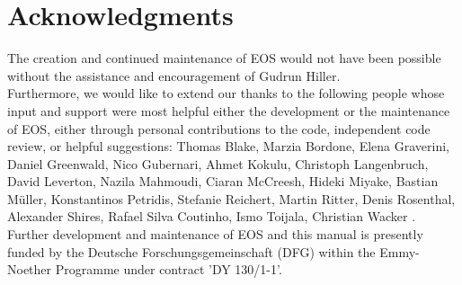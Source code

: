 \chapter{Acknowledgments}

The creation and continued maintenance of EOS would not have been possible without
the assistance and encouragement of Gudrun Hiller.\\

Furthermore, we would like to extend our thanks to the following people
whose input and support were most helpful either the development or the
maintenance of EOS, either through personal contributions to the code,
independent code review, or helpful suggestions:
Thomas Blake,
Marzia Bordone,
Elena Graverini,
Daniel Greenwald,
Nico Gubernari,
Ahmet Kokulu,
Christoph Langenbruch,
David Leverton,
Nazila Mahmoudi,
Ciaran McCreesh,
Hideki Miyake,
Bastian Müller,
Konstantinos Petridis,
Stefanie Reichert,
Martin Ritter,
Denis Rosenthal,
Alexander Shires,
Rafael Silva Coutinho,
Ismo Toijala,
Christian Wacker
.\\

Further development and maintenance of EOS and this manual is presently funded by the
Deutsche Forschungsgemeinschaft (DFG) within the Emmy-Noether Programme under contract
'DY 130/1-1'.
